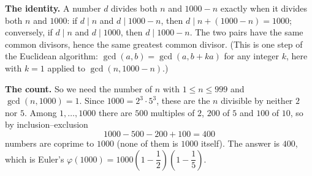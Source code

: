\textbf{The identity.} A number $d$ divides both $n$ and $1000-n$ exactly when it divides both $n$ and $1000$: if $d\mid n$ and $d\mid1000-n$, then $d\mid n+(1000-n)=1000$; conversely, if $d\mid n$ and $d\mid1000$, then $d\mid1000-n$. The two pairs have the same common divisors, hence the same greatest common divisor. (This is one step of the Euclidean algorithm: $\gcd(a,b)=\gcd(a,b+ka)$ for any integer $k$, here with $k=1$ applied to $\gcd(n,1000-n)$.)

\textbf{The count.} So we need the number of $n$ with $1\le n\le999$ and $\gcd(n,1000)=1$. Since $1000=2^3\cdot5^3$, these are the $n$ divisible by neither $2$ nor $5$. Among $1,\dots,1000$ there are $500$ multiples of $2$, $200$ of $5$ and $100$ of $10$, so by inclusion--exclusion
\[
1000-500-200+100=400
\]
numbers are coprime to $1000$ (none of them is $1000$ itself). The answer is $\boxed{400}$, which is Euler's $\varphi(1000)=1000\left(1-\dfrac{1}{2}\right)\left(1-\dfrac{1}{5}\right)$.
